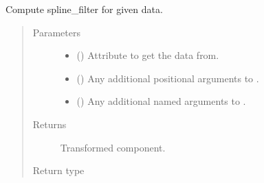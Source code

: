 \documentclass[letterpaper,10pt,english]{sphinxmanual}
\begin{document}
\begin{fulllineitems}
\begin{fulllineitems}
\label{\detokenize{api/states:geology.src.States.spline_filter}}
Compute spline\_filter for given data.
\begin{quote}\begin{description}
\item[{Parameters}] \leavevmode\begin{itemize}
\item {} 
 (\sphinxstyleliteralemphasis{\sphinxupquote{, }}) \textendash{} Attribute to get the data from.

\item {} 
 () \textendash{} Any additional positional arguments to .

\item {} 
 () \textendash{} Any additional named arguments to .

\end{itemize}

\item[{Returns}] \leavevmode
{} \textendash{} Transformed component.

\item[{Return type}] \leavevmode
{\hyperref[\detokenize{api/base_classes:geology.src.base_spatial.SpatialComponent}]{}}

\end{description}\end{quote}

\end{fulllineitems}



\end{fulllineitems}
\end{document}

